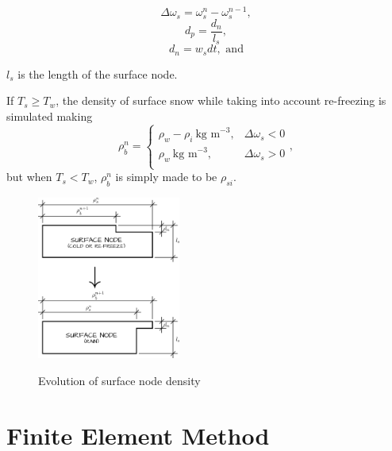 \documentclass{article}%
\begin{document}
  $$\Delta \omega_s = \omega_s^{n} - \omega_s^{n-1},$$ 
  $$d_p = \frac{d_n}{l_s},$$
  $$d_n = w_sdt,\text{ and}$$
  \begin{center}$l_s$ is the length of the surface node.\end{center}
If $T_s \geq T_w$, the density of surface snow while taking into account re-freezing is simulated making
  $$
  \rho_{\dot{b}}^n = 
  \begin{cases}
    \rho_w - \rho_i\ \text{kg m}^{-3},  &\Delta\omega_s < 0\\
    \rho_w\ \text{kg m}^{-3}, &\Delta\omega_s > 0\\
  \end{cases},
  $$
but when $T_s < T_w$, $\rho_{\dot{b}}^n$ is simply made to be $\rho_{si}$.
\begin{figure}[H]
	\centering
		\includegraphics[width=0.42\textwidth]{images/surfaceDensity.png}
	\label{fig:500 year orbit}
	\caption{Evolution of surface node density}
\end{figure}

\section{Finite Element Method}
\end{document}
